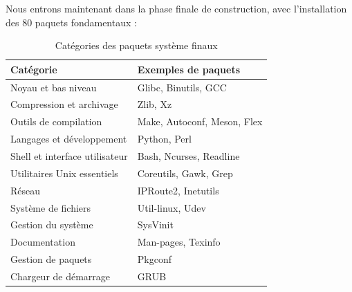 Nous entrons maintenant dans la phase finale de construction, avec l’installation des 80 paquets fondamentaux :
\begin{table}[H]
\centering
\begin{tabular}{|l|l|}
\hline
\textbf{Catégorie} & \textbf{Exemples de paquets} \\
\hline
Noyau et bas niveau & Glibc, Binutils, GCC \\
\hline
Compression et archivage & Zlib, Xz \\
\hline
Outils de compilation & Make, Autoconf, Meson, Flex \\
\hline
Langages et développement & Python, Perl \\
\hline
Shell et interface utilisateur & Bash, Ncurses, Readline \\
\hline
Utilitaires Unix essentiels & Coreutils, Gawk, Grep \\
\hline
Réseau & IPRoute2, Inetutils \\
\hline
Système de fichiers & Util-linux, Udev \\
\hline
Gestion du système & SysVinit \\
\hline
Documentation & Man-pages, Texinfo \\
\hline
Gestion de paquets & Pkgconf \\
\hline
Chargeur de démarrage & GRUB \\
\hline
\end{tabular}
\caption{Catégories des paquets système finaux}
\label{tab:categories-paquets}
\end{table}





